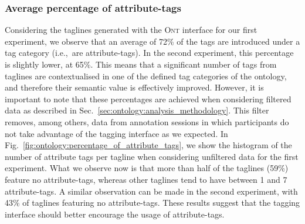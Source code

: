 \subsubsection{Average percentage of attribute-tags}




Considering the taglines generated with the \textsc{Ont} interface for our first experiment, we observe that an average of 72\% of the tags are introduced under a tag category (i.e.,~are attribute-tags). In the second experiment, this percentage is slightly lower, at 65\%.
This means that a significant number of tags from taglines are contextualised in one of the defined tag categories of the ontology, and therefore their semantic value is effectively improved.
However, it is important to note that these percentages are achieved when considering filtered data as described in Sec.~\ref{sec:ontology:analysis_methodology}. This filter removes, among others, data from annotation sessions in which participants do not take advantage of the tagging interface as we expected. %
In Fig.~\ref{fig:ontology:percentage_of_attribute_tags}, we show the histogram of the number of attribute tags per tagline when considering unfiltered data for the first experiment. What we observe now is that more than half of the taglines (59\%) feature no attribute-tags, whereas other taglines tend to have between 1 and 7 attribute-tags. A similar observation can be made in the second experiment, with 43\% of taglines featuring no attribute-tags.
These results suggest that the tagging interface should better encourage the usage of attribute-tags.

